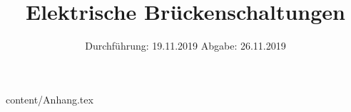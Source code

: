 

\subject{Versuch 302}
\title{Elektrische Brückenschaltungen}
\date{%
  Durchführung: 19.11.2019
  \hspace{3em}
  Abgabe: 26.11.2019
}



\maketitle
\thispagestyle{empty}
\tableofcontents
\newpage





\nocite{*}
\printbibliography{}
 {content/Anhang.tex}


